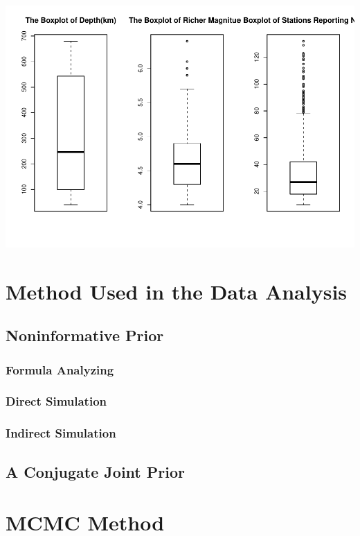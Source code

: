 \documentclass[]{article}
\begin{document}
\includegraphics{Bayes-Project-by-lzy,-xt2_files/figure-latex/unnamed-chunk-1-3.pdf}

\section{Method Used in the Data
Analysis}\label{method-used-in-the-data-analysis}

\subsection{Noninformative Prior}\label{noninformative-prior}

\subsubsection{Formula Analyzing}\label{formula-analyzing}

\subsubsection{Direct Simulation}\label{direct-simulation}

\subsubsection{Indirect Simulation}\label{indirect-simulation}

\subsection{A Conjugate Joint Prior}\label{a-conjugate-joint-prior}

\section{MCMC Method}\label{mcmc-method}
\end{document}
